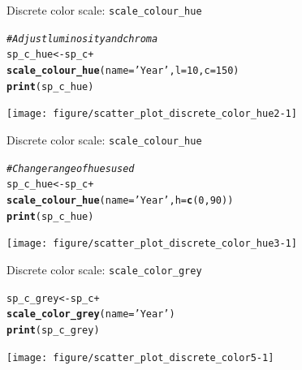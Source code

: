 \documentclass{beamer}\usepackage[]{graphicx}\usepackage[]{color}
\makeatletter
\newcommand{\hlnum}[1]{\textcolor[rgb]{0.686,0.059,0.569}{#1}}%
\newcommand{\hlstr}[1]{\textcolor[rgb]{0.192,0.494,0.8}{#1}}%
\newcommand{\hlcom}[1]{\textcolor[rgb]{0.678,0.584,0.686}{\textit{#1}}}%
\newcommand{\hlopt}[1]{\textcolor[rgb]{0,0,0}{#1}}%
\newcommand{\hlstd}[1]{\textcolor[rgb]{0.345,0.345,0.345}{#1}}%
\newcommand{\hlkwb}[1]{\textcolor[rgb]{0.69,0.353,0.396}{#1}}%
\newcommand{\hlkwc}[1]{\textcolor[rgb]{0.333,0.667,0.333}{#1}}%
\newcommand{\hlkwd}[1]{\textcolor[rgb]{0.737,0.353,0.396}{\textbf{#1}}}%
\newenvironment{kframe}{%
 \def\at@end@of@kframe{}%
 \ifinner\ifhmode%
  \def\at@end@of@kframe{\end{minipage}}%
  \begin{minipage}{\columnwidth}%
 \fi\fi%
 \def\FrameCommand##1{\hskip\@totalleftmargin \hskip-\fboxsep
 \colorbox{shadecolor}{##1}\hskip-\fboxsep
     \hskip-\linewidth \hskip-\@totalleftmargin \hskip\columnwidth}%
 \MakeFramed {\advance\hsize-\width
   \@totalleftmargin\z@ \linewidth\hsize
   \@setminipage}}%
 {\par\unskip\endMakeFramed%
 \at@end@of@kframe}
\newenvironment{knitrout}{}{} %
\makeatother
\begin{document}
\begin{frame}[fragile]{Discrete color scale: \lstinline{scale_colour_hue}}
\begin{knitrout}\footnotesize
{}\color{fgcolor}\begin{kframe}
\begin{alltt}
\hlcom{# Adjust luminosity and chroma}
\hlstd{sp_c_hue} \hlkwb{<-} \hlstd{sp_c} \hlopt{+}
 \hlkwd{scale_colour_hue}\hlstd{(}\hlkwc{name}\hlstd{=}\hlstr{'Year'}\hlstd{,} \hlkwc{l}\hlstd{=}\hlnum{10}\hlstd{,} \hlkwc{c}\hlstd{=}\hlnum{150}\hlstd{)}
\hlkwd{print}\hlstd{(sp_c_hue)}
\end{alltt}
\end{kframe}

{\centering \texttt{[image: figure/scatter\_plot\_discrete\_color\_hue2-1]} 

}



\end{knitrout}
\end{frame}

\begin{frame}[fragile]{Discrete color scale: \lstinline{scale_colour_hue}}
\begin{knitrout}\footnotesize
{}\color{fgcolor}\begin{kframe}
\begin{alltt}
\hlcom{# Change range of hues used}
\hlstd{sp_c_hue} \hlkwb{<-} \hlstd{sp_c} \hlopt{+}
 \hlkwd{scale_colour_hue}\hlstd{(}\hlkwc{name}\hlstd{=}\hlstr{'Year'}\hlstd{,} \hlkwc{h}\hlstd{=}\hlkwd{c}\hlstd{(}\hlnum{0}\hlstd{,} \hlnum{90}\hlstd{))}
\hlkwd{print}\hlstd{(sp_c_hue)}
\end{alltt}
\end{kframe}

{\centering \texttt{[image: figure/scatter\_plot\_discrete\_color\_hue3-1]} 

}



\end{knitrout}
\end{frame}

\begin{frame}[fragile]{Discrete color scale: \lstinline{scale_color_grey}}
\begin{knitrout}\footnotesize
{}\color{fgcolor}\begin{kframe}
\begin{alltt}
\hlstd{sp_c_grey} \hlkwb{<-} \hlstd{sp_c} \hlopt{+}
  \hlkwd{scale_color_grey}\hlstd{(}\hlkwc{name}\hlstd{=}\hlstr{'Year'}\hlstd{)}
\hlkwd{print}\hlstd{(sp_c_grey)}
\end{alltt}
\end{kframe}

{\centering \texttt{[image: figure/scatter\_plot\_discrete\_color5-1]} 

}



\end{knitrout}
\end{frame}
\end{document}
